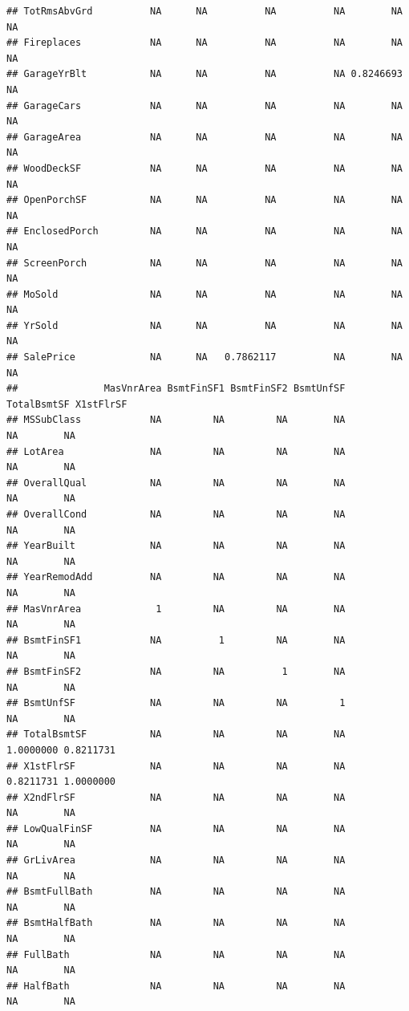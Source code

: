\documentclass[
]{article}
\begin{document}
\begin{verbatim}
## TotRmsAbvGrd          NA      NA          NA          NA        NA           NA
## Fireplaces            NA      NA          NA          NA        NA           NA
## GarageYrBlt           NA      NA          NA          NA 0.8246693           NA
## GarageCars            NA      NA          NA          NA        NA           NA
## GarageArea            NA      NA          NA          NA        NA           NA
## WoodDeckSF            NA      NA          NA          NA        NA           NA
## OpenPorchSF           NA      NA          NA          NA        NA           NA
## EnclosedPorch         NA      NA          NA          NA        NA           NA
## ScreenPorch           NA      NA          NA          NA        NA           NA
## MoSold                NA      NA          NA          NA        NA           NA
## YrSold                NA      NA          NA          NA        NA           NA
## SalePrice             NA      NA   0.7862117          NA        NA           NA
##               MasVnrArea BsmtFinSF1 BsmtFinSF2 BsmtUnfSF TotalBsmtSF X1stFlrSF
## MSSubClass            NA         NA         NA        NA          NA        NA
## LotArea               NA         NA         NA        NA          NA        NA
## OverallQual           NA         NA         NA        NA          NA        NA
## OverallCond           NA         NA         NA        NA          NA        NA
## YearBuilt             NA         NA         NA        NA          NA        NA
## YearRemodAdd          NA         NA         NA        NA          NA        NA
## MasVnrArea             1         NA         NA        NA          NA        NA
## BsmtFinSF1            NA          1         NA        NA          NA        NA
## BsmtFinSF2            NA         NA          1        NA          NA        NA
## BsmtUnfSF             NA         NA         NA         1          NA        NA
## TotalBsmtSF           NA         NA         NA        NA   1.0000000 0.8211731
## X1stFlrSF             NA         NA         NA        NA   0.8211731 1.0000000
## X2ndFlrSF             NA         NA         NA        NA          NA        NA
## LowQualFinSF          NA         NA         NA        NA          NA        NA
## GrLivArea             NA         NA         NA        NA          NA        NA
## BsmtFullBath          NA         NA         NA        NA          NA        NA
## BsmtHalfBath          NA         NA         NA        NA          NA        NA
## FullBath              NA         NA         NA        NA          NA        NA
## HalfBath              NA         NA         NA        NA          NA        NA

\end{verbatim}
\end{document}
